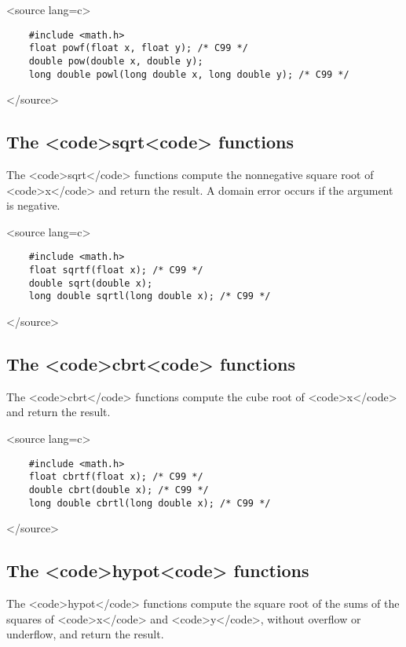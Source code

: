 \textless{}source lang=c\textgreater{}
\begin{verbatim}
	#include <math.h>
	float powf(float x, float y); /* C99 */
	double pow(double x, double y);
	long double powl(long double x, long double y); /* C99 */
\end{verbatim}
\textless{}/source\textgreater{}

\subsection{The \textless{}code\textgreater{}sqrt\textless{}code\textgreater{} functions}

The \textless{}code\textgreater{}sqrt\textless{}/code\textgreater{} functions compute the nonnegative square root of \textless{}code\textgreater{}x\textless{}/code\textgreater{} and return the result. A domain error occurs if the argument is negative.

\textless{}source lang=c\textgreater{}
\begin{verbatim}
	#include <math.h>
	float sqrtf(float x); /* C99 */
	double sqrt(double x);
	long double sqrtl(long double x); /* C99 */
\end{verbatim}
\textless{}/source\textgreater{}

\subsection{The \textless{}code\textgreater{}cbrt\textless{}code\textgreater{} functions}

The \textless{}code\textgreater{}cbrt\textless{}/code\textgreater{} functions compute the cube root of \textless{}code\textgreater{}x\textless{}/code\textgreater{} and return the result.

\textless{}source lang=c\textgreater{}
\begin{verbatim}
	#include <math.h>
	float cbrtf(float x); /* C99 */
	double cbrt(double x); /* C99 */
	long double cbrtl(long double x); /* C99 */
\end{verbatim}
\textless{}/source\textgreater{}

\subsection{The \textless{}code\textgreater{}hypot\textless{}code\textgreater{} functions}

The \textless{}code\textgreater{}hypot\textless{}/code\textgreater{} functions compute the square root of the sums of the squares of \textless{}code\textgreater{}x\textless{}/code\textgreater{} and \textless{}code\textgreater{}y\textless{}/code\textgreater{}, without overflow or underflow, and return the result.

